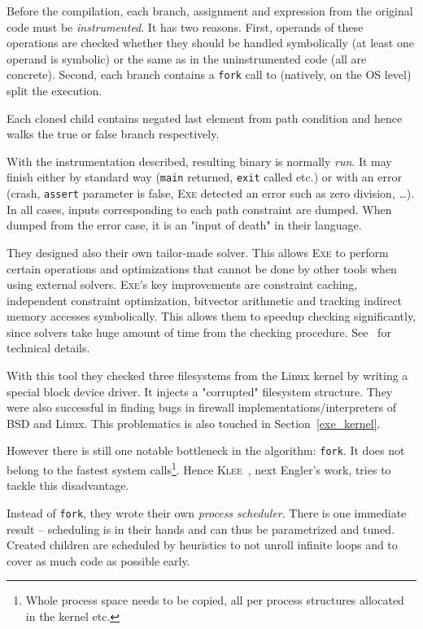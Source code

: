 \documentclass[11pt,a4paper]{article}
\begin{document}
Before the compilation, each branch, assignment and expression from the
original code must be \emph{instrumented}. It has two reasons. First,
operands of these operations are checked whether they should be handled
symbolically (at least one operand is symbolic) or the same as in the
uninstrumented code (all are concrete). Second, each branch contains a
\texttt{fork} call to (natively, on the OS level) split the execution.

Each cloned child contains negated last element from path condition and hence
walks the true or false branch respectively.

With the instrumentation described, resulting binary is normally \emph{run}.
It may finish either by standard way (\texttt{main} returned, \texttt{exit}
called etc.) or with an error (crash, \texttt{assert} parameter is false,
\textsc{Exe} detected an error such as zero division, \ldots). In all cases,
inputs corresponding to each path constraint are dumped. When dumped from the
error case, it is an "input of death" in their language.

They designed also their own tailor-made solver. This allows \textsc{Exe} to
perform certain operations and optimizations that cannot be done by other
tools when using external solvers. \textsc{Exe}'s key improvements are
constraint caching, independent constraint optimization, bitvector arithmetic
and tracking indirect memory accesses symbolically. This allows them to
speedup checking significantly, since solvers take huge amount of time from
the checking procedure. See~\cite{exe} for technical details.

With this tool they checked three filesystems from the Linux kernel by writing
a special block device driver. It injects a "corrupted" filesystem structure.
They were also successful in finding bugs in firewall
implementations/interpreters of BSD and Linux. This problematics is also
touched in Section~\ref{exe_kernel}.

However there is still one notable bottleneck in the algorithm: \texttt{fork}.
It does not belong to the fastest system calls\footnote{Whole process space
needs to be copied, all per process structures allocated in the kernel etc.}.
Hence \textsc{Klee}~\cite{klee}, next Engler's work, tries to tackle this
disadvantage.

Instead of \texttt{fork}, they wrote their own \emph{process scheduler}. There
is one immediate result -- scheduling is in their hands and can thus be
parametrized and tuned. Created children are scheduled by heuristics to not
unroll infinite loops and to cover as much code as possible early.
\end{document}
